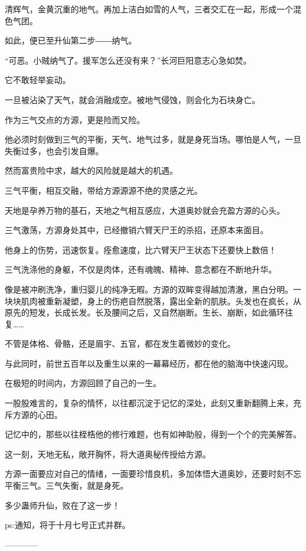 \begin{this_body}
清辉气，金黄沉重的地气。再加上洁白如雪的人气，三者交汇在一起，形成一个混色气团。

如此，便已至升仙第二步――纳气。

“可恶。小贼纳气了。援军怎么还没有来？”长河巨阳意志心急如焚。

它不敢轻举妄动。

一旦被沾染了天气，就会消融成空。被地气侵蚀，则会化为石块身亡。

作为三气交点的方源，更是险而又险。

他必须时刻做到三气的平衡，天气、地气过多，就是身死当场。哪怕是人气，一旦失衡过多，也会引发自爆。

然而富贵险中求，越大的风险就是越大的机遇。

三气平衡，相互交融，带给方源源源不绝的灵感之光。

天地是孕养万物的基石，天地之气相互感应，大道奥妙就会充盈方源的心头。

三气激荡，方源身处其中，已经撤销六臂天尸王的杀招，还原本来面目。

他身上的伤势，迅速恢复。痊愈速度，比六臂天尸王状态下还要快上数倍！

三气洗涤他的身躯，不仅是肉体，还有魂魄、精神、意念都在不断地升华。

像是被冲刷洗净，重归婴儿的纯净无暇。方源的双眸变得越加清澈，黑白分明。一块块肌肉被重新凝塑，身上的伤疤自然脱落，露出全新的肌肤。头发也在疯长，从原先的短发，长成长发。长及腰间之后，又自然崩断。生长、崩断，如此循环往复……

不管是体格、骨骼，还是眉宇、五官，都在发生着微妙的变化。

与此同时，前世五百年以及重生以来的一幕幕经历，都在他的脑海中快速闪现。

在极短的时间内，方源回顾了自己的一生。

一股股难言的，复杂的情怀，以往都沉淀于记忆的深处，此刻又重新翻腾上来，充斥方源的心田。

记忆中的，那些以往桎梏他的修行难题，也有如神助般，得到一个个的完美解答。

这一刻，天地无私，敞开胸怀，将大道奥秘传授给方源。

方源一面要应对自己的情绪，一面要珍惜良机，多加体悟大道奥妙，还要时刻不忘平衡三气。三气失衡，就是身死。

多少蛊师升仙，败在了这一步！

ps:通知，将于十月七号正式并群。

------------

\end{this_body}

